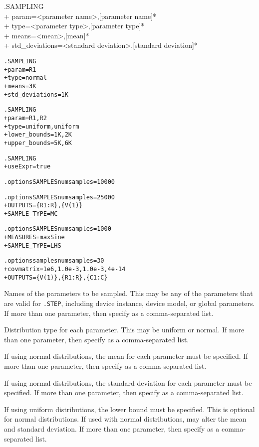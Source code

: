 \begin{Command}
\format
.SAMPLING  \\
+ param=<parameter name>,[parameter name]*  \\
+ type=<parameter type>,[parameter type]*  \\
+ means=<mean>,[mean]*  \\
+ std\_deviations=<standard deviation>,[standard deviation]* 

\examples
\begin{alltt}
.SAMPLING
+ param=R1
+ type=normal
+ means=3K
+ std\_deviations=1K

.SAMPLING
+ param=R1,R2
+ type=uniform,uniform
+ lower\_bounds=1K,2K
+ upper\_bounds=5K,6K

.SAMPLING
+ useExpr=true

.options SAMPLES numsamples=10000

.options SAMPLES numsamples=25000
+ OUTPUTS=\{R1:R\},\{V(1)\}
+ SAMPLE\_TYPE=MC

.options SAMPLES numsamples=1000
+ MEASURES=maxSine
+ SAMPLE\_TYPE=LHS

.options samples numsamples=30
+ covmatrix=1e6,1.0e-3,1.0e-3,4e-14
+ OUTPUTS=\{V(1)\},\{R1:R\},\{C1:C\}
\end{alltt}

\arguments

\begin{Arguments}

Names of the parameters to be sampled.  This may be any of the parameters that are valid 
for \verb|.STEP|, including device instance, device model, or global parameters.  
  If more than one parameter, then specify as a comma-separated list.

Distribution type for each parameter.  This may be uniform or normal.  
  If more than one parameter, then specify as a comma-separated list.

If using normal distributions, the mean for each parameter must be specified.
  If more than one parameter, then specify as a comma-separated list.

If using normal distributions, the standard deviation for each parameter must be specified.
  If more than one parameter, then specify as a comma-separated list.

If using uniform distributions, the lower bound must be specified.  This is optional for normal distributions.  
  If used with normal distributions, may alter the mean and standard deviation.
  If more than one parameter, then specify as a comma-separated list.


\end{Arguments}
\end{Command}
